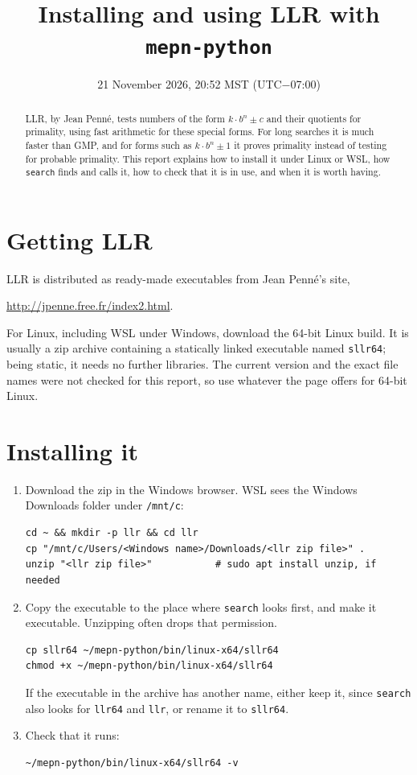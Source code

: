 \documentclass[11pt]{article}
\title{Installing and using LLR with \texttt{mepn-python}}
\author{}  %
\date{21 November 2026, 20:52 MST (UTC$-$07:00)}
\newcommand{\code}[1]{\texttt{#1}}
\begin{document}
\maketitle

\begin{abstract}
LLR, by Jean Penn\'e, tests numbers of the form $k\cdot b^n\pm c$ and their quotients for primality, using fast arithmetic for these special forms. For long searches it is much faster than GMP, and for forms such as $k\cdot b^n\pm1$ it proves primality instead of testing for probable primality. This report explains how to install it under Linux or WSL, how \code{search} finds and calls it, how to check that it is in use, and when it is worth having.
\end{abstract}

\section{Getting LLR}

LLR is distributed as ready-made executables from Jean Penn\'e's site,
\begin{center}
\url{http://jpenne.free.fr/index2.html}.
\end{center}
For Linux, including WSL under Windows, download the 64-bit Linux build. It is usually a zip archive containing a statically linked executable named \code{sllr64}; being static, it needs no further libraries. The current version and the exact file names were not checked for this report, so use whatever the page offers for 64-bit Linux.

\section{Installing it}

\begin{enumerate}[label=\arabic*.]
\item Download the zip in the Windows browser. WSL sees the Windows Downloads folder under \code{/mnt/c}:
\begin{Verbatim}
cd ~ && mkdir -p llr && cd llr
cp "/mnt/c/Users/<Windows name>/Downloads/<llr zip file>" .
unzip "<llr zip file>"           # sudo apt install unzip, if needed
\end{Verbatim}

\item Copy the executable to the place where \code{search} looks first, and make it executable. Unzipping often drops that permission.
\begin{Verbatim}
cp sllr64 ~/mepn-python/bin/linux-x64/sllr64
chmod +x ~/mepn-python/bin/linux-x64/sllr64
\end{Verbatim}
If the executable in the archive has another name, either keep it, since \code{search} also looks for \code{llr64} and \code{llr}, or rename it to \code{sllr64}.

\item Check that it runs:
\begin{Verbatim}
~/mepn-python/bin/linux-x64/sllr64 -v
\end{Verbatim}
\end{enumerate}
\end{document}
